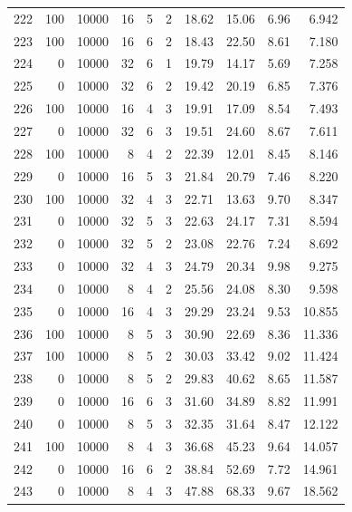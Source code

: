 \begin{footnotesize}
\begin{longtable}{@{}rrrrrrrrrr@{}}
222 & 100 & 10000 & 16 & 5 & 2 & 18.62 & 15.06 & 6.96 & 6.942 \\
223 & 100 & 10000 & 16 & 6 & 2 & 18.43 & 22.50 & 8.61 & 7.180 \\
224 & 0 & 10000 & 32 & 6 & 1 & 19.79 & 14.17 & 5.69 & 7.258 \\
225 & 0 & 10000 & 32 & 6 & 2 & 19.42 & 20.19 & 6.85 & 7.376 \\
226 & 100 & 10000 & 16 & 4 & 3 & 19.91 & 17.09 & 8.54 & 7.493 \\
227 & 0 & 10000 & 32 & 6 & 3 & 19.51 & 24.60 & 8.67 & 7.611 \\
228 & 100 & 10000 & 8 & 4 & 2 & 22.39 & 12.01 & 8.45 & 8.146 \\
229 & 0 & 10000 & 16 & 5 & 3 & 21.84 & 20.79 & 7.46 & 8.220 \\
230 & 100 & 10000 & 32 & 4 & 3 & 22.71 & 13.63 & 9.70 & 8.347 \\
231 & 0 & 10000 & 32 & 5 & 3 & 22.63 & 24.17 & 7.31 & 8.594 \\
232 & 0 & 10000 & 32 & 5 & 2 & 23.08 & 22.76 & 7.24 & 8.692 \\
233 & 0 & 10000 & 32 & 4 & 3 & 24.79 & 20.34 & 9.98 & 9.275 \\
234 & 0 & 10000 & 8 & 4 & 2 & 25.56 & 24.08 & 8.30 & 9.598 \\
235 & 0 & 10000 & 16 & 4 & 3 & 29.29 & 23.24 & 9.53 & 10.855 \\
236 & 100 & 10000 & 8 & 5 & 3 & 30.90 & 22.69 & 8.36 & 11.336 \\
237 & 100 & 10000 & 8 & 5 & 2 & 30.03 & 33.42 & 9.02 & 11.424 \\
238 & 0 & 10000 & 8 & 5 & 2 & 29.83 & 40.62 & 8.65 & 11.587 \\
239 & 0 & 10000 & 16 & 6 & 3 & 31.60 & 34.89 & 8.82 & 11.991 \\
240 & 0 & 10000 & 8 & 5 & 3 & 32.35 & 31.64 & 8.47 & 12.122 \\
241 & 100 & 10000 & 8 & 4 & 3 & 36.68 & 45.23 & 9.64 & 14.057 \\
242 & 0 & 10000 & 16 & 6 & 2 & 38.84 & 52.69 & 7.72 & 14.961 \\
243 & 0 & 10000 & 8 & 4 & 3 & 47.88 & 68.33 & 9.67 & 18.562 \\
\end{longtable}
\end{footnotesize}

